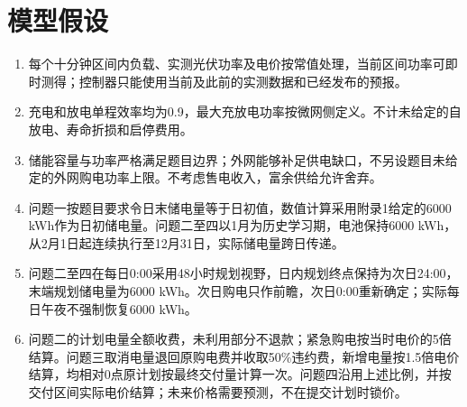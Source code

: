 \section{模型假设}
\begin{enumerate}[label=(\arabic*),leftmargin=2.2em]
\item 每个十分钟区间内负载、实测光伏功率及电价按常值处理，当前区间功率可即时测得；控制器只能使用当前及此前的实测数据和已经发布的预报。
\item 充电和放电单程效率均为0.9，最大充放电功率按微网侧定义。不计未给定的自放电、寿命折损和启停费用。
\item 储能容量与功率严格满足题目边界；外网能够补足供电缺口，不另设题目未给定的外网购电功率上限。不考虑售电收入，富余供给允许舍弃。
\item 问题一按题目要求令日末储电量等于日初值，数值计算采用附录1给定的6000 kWh作为日初储电量。问题二至四以1月为历史学习期，电池保持6000 kWh，从2月1日起连续执行至12月31日，实际储电量跨日传递。
\item 问题二至四在每日0:00采用48小时规划视野，日内规划终点保持为次日24:00，末端规划储电量为6000 kWh。次日购电只作前瞻，次日0:00重新确定；实际每日午夜不强制恢复6000 kWh。
\item 问题二的计划电量全额收费，未利用部分不退款；紧急购电按当时电价的5倍结算。问题三取消电量退回原购电费并收取50\%违约费，新增电量按1.5倍电价结算，均相对0点原计划按最终交付量计算一次。问题四沿用上述比例，并按交付区间实际电价结算；未来价格需要预测，不在提交计划时锁价。
\end{enumerate}


